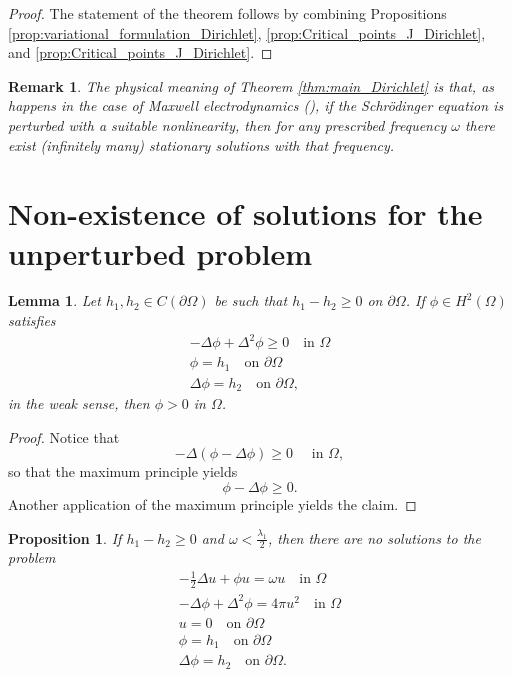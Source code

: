 \documentclass[10pt,a4paper]{amsart}
\numberwithin{equation}{section}
\newtheorem{lemma}[theo]{Lemma}
\newtheorem{proposition}[theo]{Proposition}
\newtheorem{remark}[theo]{Remark}
\begin{document}
\begin{proof}
The statement of the theorem follows by combining Propositions 
\ref{prop:variational_formulation_Dirichlet}, 
\ref{prop:Critical_points_J_Dirichlet}, and \ref{prop:Critical_points_J_Dirichlet}.
\end{proof}

\begin{remark} \rm
 The physical meaning of Theorem \ref{thm:main_Dirichlet} is that, as happens 
in the case of Maxwell electrodynamics (\cite{PisaniSiciliano2007b}), 
if the Schr\"odinger equation is perturbed with a suitable nonlinearity, then for 
any prescribed frequency $\omega$ there exist (infinitely many) stationary solutions 
with that frequency.
\end{remark}

\section{Non-existence of solutions for the unperturbed problem}
\label{sec:nonexistence}

\begin{lemma}
 \label{lem:max_principle_Dirichlet}
Let $h_1, h_2 \in C(\partial\Omega)$ be such that $h_1 - h_2 \geq 0$ on $\partial\Omega$.
If $\phi \in H^2(\Omega)$ satisfies
 \begin{gather*}
 - \Delta \phi + \Delta^2 \phi  \geq  0  \quad \text{in } \Omega \\
 \phi  =  h_1  \quad \text{on } \partial\Omega \\
 \Delta \phi  =  h_2  \quad \text{on } \partial\Omega,
 \end{gather*}
in the weak sense, then $\phi > 0$ in $\Omega$.
\end{lemma}

\begin{proof}
Notice that 
\[
 - \Delta (\phi - \Delta \phi) \geq 0 \quad \text{ in } \Omega,
\]
so that the maximum principle yields
\[
 \phi - \Delta \phi \geq 0.
\]
Another application of the maximum principle yields the claim.
\end{proof}

\begin{proposition}
If $h_1 - h_2 \geq 0$ and $\omega < \frac{\lambda_1}{2}$, then there are no 
solutions to the problem
 \begin{gather*}
 - \frac{1}{2} \Delta u + \phi u  =  \omega u  \quad \text{in } \Omega \\
 - \Delta \phi + \Delta^2 \phi  =  4 \pi u^2  \quad \text{in } \Omega \\
 u  =  0  \quad \text{on } \partial\Omega \\
 \phi  =  h_1  \quad \text{on } \partial\Omega \\
 \Delta \phi  =  h_2  \quad \text{on } \partial\Omega .
 \end{gather*}
\end{proposition}
\end{document}
